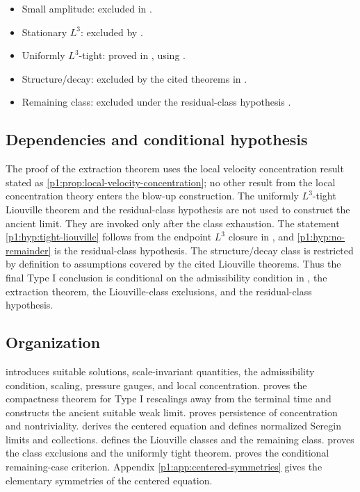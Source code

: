 \documentclass[11pt]{amsart}
\theoremstyle{plain}
\theoremstyle{definition}
\theoremstyle{remark}
\numberwithin{equation}{section}
\begin{document}
\begin{itemize}[leftmargin=*,itemsep=2pt]
\item Small amplitude: excluded in .
\item Stationary \(L^3\): excluded by \cite{NRS1996}.
\item Uniformly \(L^3\)-tight: proved in , using
.
\item Structure/decay: excluded by the cited theorems in
.
\item Remaining class: excluded under the residual-class hypothesis
.
\end{itemize}

\subsection{Dependencies and conditional hypothesis}

The proof of the extraction theorem uses the local velocity concentration
result stated as \cref{p1:prop:local-velocity-concentration}; no other result
from the local concentration theory enters the blow-up construction.
The uniformly \(L^3\)-tight Liouville theorem and the residual-class hypothesis
are not used to construct the ancient limit.  They are invoked only after the
class exhaustion.  The statement \cref{p1:hyp:tight-liouville} follows from the
endpoint \(L^3\) closure in , and
\cref{p1:hyp:no-remainder} is the residual-class hypothesis.  The
structure/decay class is restricted by definition to assumptions covered by
the cited Liouville theorems.  Thus the final Type I conclusion is conditional
on the admissibility condition in , the
extraction theorem, the Liouville-class exclusions, and the
residual-class hypothesis.

\subsection{Organization}

 introduces suitable solutions, scale-invariant quantities,
the admissibility condition, scaling, pressure gauges, and local concentration.
 proves the compactness theorem for Type I
rescalings away from the terminal time and constructs the ancient suitable
weak limit.   proves persistence of concentration and
nontriviality.   derives the centered equation and defines
normalized Seregin limits and collections.   defines the
Liouville classes and the remaining class.   proves the
class exclusions and the uniformly tight theorem.   proves
the conditional remaining-case criterion.  Appendix \ref{p1:app:centered-symmetries} gives
the elementary symmetries of the centered equation.
\end{document}
